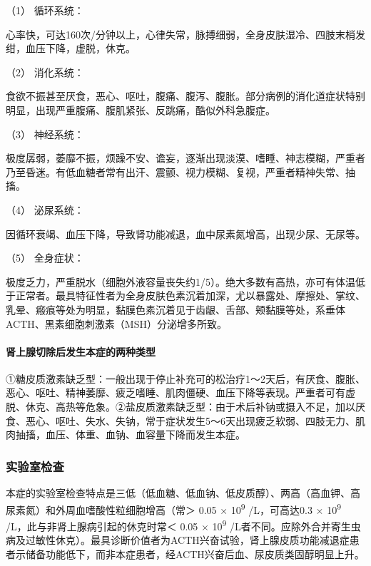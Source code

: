 \hypertarget{text00116.htmlux5cux23CHP4-11-2-1-2-1}{}
（1） 循环系统：

心率快，可达160次/分钟以上，心律失常，脉搏细弱，全身皮肤湿冷、四肢末梢发绀，血压下降，虚脱，休克。

\hypertarget{text00116.htmlux5cux23CHP4-11-2-1-2-2}{}
（2） 消化系统：

食欲不振甚至厌食，恶心、呕吐，腹痛、腹泻、腹胀。部分病例的消化道症状特别明显，出现严重腹痛、腹肌紧张、反跳痛，酷似外科急腹症。

\hypertarget{text00116.htmlux5cux23CHP4-11-2-1-2-3}{}
（3） 神经系统：

极度孱弱，萎靡不振，烦躁不安、谵妄，逐渐出现淡漠、嗜睡、神志模糊，严重者乃至昏迷。有低血糖者常有出汗、震颤、视力模糊、复视，严重者精神失常、抽搐。

\hypertarget{text00116.htmlux5cux23CHP4-11-2-1-2-4}{}
（4） 泌尿系统：

因循环衰竭、血压下降，导致肾功能减退，血中尿素氮增高，出现少尿、无尿等。

\hypertarget{text00116.htmlux5cux23CHP4-11-2-1-2-5}{}
（5） 全身症状：

极度乏力，严重脱水（细胞外液容量丧失约1/5）。绝大多数有高热，亦可有体温低于正常者。最具特征性者为全身皮肤色素沉着加深，尤以暴露处、摩擦处、掌纹、乳晕、瘢痕等处为明显，黏膜色素沉着见于齿龈、舌部、颊黏膜等处，系垂体ACTH、黑素细胞刺激素（MSH）分泌增多所致。

\paragraph{肾上腺切除后发生本症的两种类型}

①糖皮质激素缺乏型：一般出现于停止补充可的松治疗1～2天后，有厌食、腹胀、恶心、呕吐、精神萎靡、疲乏嗜睡、肌肉僵硬、血压下降等表现。严重者可有虚脱、休克、高热等危象。②盐皮质激素缺乏型：由于术后补钠或摄入不足，加以厌食、恶心、呕吐、失水、失钠，常于症状发生5～6天出现疲乏软弱、四肢无力、肌肉抽搐，血压、体重、血钠、血容量下降而发生本症。

\subsubsection{实验室检查}

本症的实验室检查特点是三低（低血糖、低血钠、低皮质醇）、两高（高血钾、高尿素氮）和外周血嗜酸性粒细胞增高（常＞
0.05 × 10\textsuperscript{9} /L，可高达0.3 × 10\textsuperscript{9}
/L，此与非肾上腺病引起的休克时常＜ 0.05 × 10\textsuperscript{9}
/L者不同。应除外合并寄生虫病及过敏性休克）。最具诊断价值者为ACTH兴奋试验，肾上腺皮质功能减退症患者示储备功能低下，而非本症患者，经ACTH兴奋后血、尿皮质类固醇明显上升。

